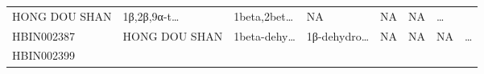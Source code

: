 \documentclass[
]{article}
\begin{document}
\begin{longtable}[]{@{}llllllll@{}}
\begin{minipage}[t]{0.11\columnwidth}
HONG DOU SHAN\strut
\end{minipage} & \begin{minipage}[t]{0.14\columnwidth}\raggedright
1β,2β,9α-t\ldots{}\strut
\end{minipage} & \begin{minipage}[t]{0.14\columnwidth}\raggedright
1beta,2bet\ldots{}\strut
\end{minipage} & \begin{minipage}[t]{0.08\columnwidth}\raggedright
NA\strut
\end{minipage} & \begin{minipage}[t]{0.09\columnwidth}\raggedright
NA\strut
\end{minipage} & \begin{minipage}[t]{0.11\columnwidth}\raggedright
NA\strut
\end{minipage} & \begin{minipage}[t]{0.03\columnwidth}\raggedright
\ldots{}\strut
\end{minipage}\tabularnewline
\begin{minipage}[t]{0.11\columnwidth}\raggedright
HBIN002387\strut
\end{minipage} & \begin{minipage}[t]{0.11\columnwidth}\raggedright
HONG DOU SHAN\strut
\end{minipage} & \begin{minipage}[t]{0.14\columnwidth}\raggedright
1beta-dehy\ldots{}\strut
\end{minipage} & \begin{minipage}[t]{0.14\columnwidth}\raggedright
1β-dehydro\ldots{}\strut
\end{minipage} & \begin{minipage}[t]{0.08\columnwidth}\raggedright
NA\strut
\end{minipage} & \begin{minipage}[t]{0.09\columnwidth}\raggedright
NA\strut
\end{minipage} & \begin{minipage}[t]{0.11\columnwidth}\raggedright
NA\strut
\end{minipage} & \begin{minipage}[t]{0.03\columnwidth}\raggedright
\ldots{}\strut
\end{minipage}\tabularnewline
\begin{minipage}[t]{0.11\columnwidth}\raggedright
HBIN002399\strut
\end{minipage} & \begin{minipage}[t]{0.11\columnwidth}\raggedright

\end{minipage}
\end{longtable}
\end{document}
